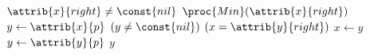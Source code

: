 \begin{codebox}
\li \If $\attrib{x}{right} \neq \const{nil}$
\li \Then 
		\Return $\proc{Min}(\attrib{x}{right})$
\li \Else
\li 	$y \gets \attrib{x}{p}$
\li 	\While $(y \neq \const{nil})$ \And $(x = \attrib{y}{right})$
\li 	\Do
			$x \gets y$
\li 		$y \gets \attrib{y}{p}$
		\End
\li 	\Return $y$
	\End
\end{codebox}